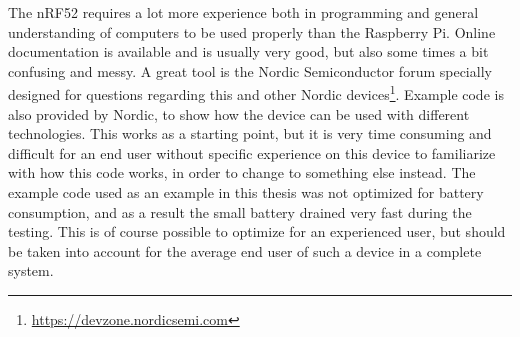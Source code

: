 \noindent The \gls{nRF52} requires a lot more experience both in programming and general understanding of computers to be used properly than the \gls{Raspberry Pi}. Online documentation is available and is usually very good, but also some times a bit confusing and messy. A great tool is the Nordic Semiconductor forum specially designed for questions regarding this and other Nordic devices\footnote{\url{https://devzone.nordicsemi.com}}. Example code is also provided by Nordic, to show how the device can be used with different technologies. This works as a starting point, but it is very time consuming and difficult for an end user without specific experience on this device to familiarize with how this code works, in order to change to something else instead. The example code used as an example in this thesis was not optimized for battery consumption, and as a result the small battery drained very fast during the testing. This is of course possible to optimize for an experienced user, but should be taken into account for the average end user of such a device in a complete system. 





